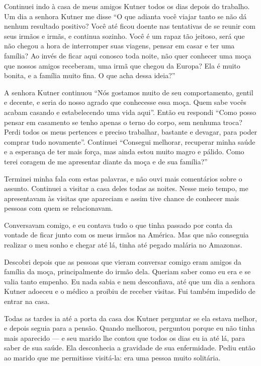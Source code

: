 Continuei indo à casa de meus amigos Kutner todos os dias depois do
trabalho. Um dia a senhora Kutner me disse ``O que adianta você viajar
tanto se não dá nenhum resultado positivo? Você até ficou doente
nas tentativas de se reunir com seus irmãos e irmãs, e continua
sozinho. Você é um rapaz tão jeitoso, será que não chegou a hora de interromper 
suas viagens, pensar em casar e ter uma família? Ao invés de ficar
aqui conosco toda noite, não quer conhecer uma moça que nossos amigos
receberam, uma irmã que chegou da Europa? Ela é muito bonita, e a família
muito fina. O que acha dessa ideia?''

A senhora Kutner continuou ``Nós gostamos muito de seu comportamento,
gentil e decente, e seria do nosso agrado que conhecesse essa moça.
Quem sabe vocês acabam casando e estabelecendo uma vida aqui''. Então
eu respondi ``Como posso pensar em casamento se tenho apenas o
terno do corpo, sem nenhuma troca? Perdi todos os
meus pertences e preciso trabalhar, bastante e devagar, para poder comprar tudo novamente''. Continuei ``Consegui melhorar, recuperar minha saúde e a esperança de ter mais força, mas ainda estou muito magro e
pálido. Como terei coragem de me apresentar diante da moça e de sua
família?''

Terminei minha fala com estas palavras, e não ouvi mais comentários sobre o assunto. 
Continuei a visitar a casa deles todas as
noites. Nesse meio tempo, me apresentavam às visitas que apareciam e assim
tive chance de conhecer mais pessoas com quem se relacionavam.

Conversavam comigo, e eu contava tudo o que tinha passado por conta da
vontade de ficar junto com os meus irmãos na América. Mas que não 
conseguia realizar o meu sonho e chegar até lá, tinha até 
pegado malária no Amazonas.

Descobri depois que as pessoas que vieram conversar comigo eram
amigos da família da moça, principalmente do irmão dela. Queriam saber
como eu era e se valia tanto empenho. Eu nada sabia e nem
desconfiava, até que um dia a senhora Kutner adoeceu e o médico a proibiu
de receber visitas. Fui também impedido de entrar na casa.

Todas as tardes ia até a porta da casa dos Kutner perguntar se ela
estava melhor, e depois seguia para a pensão. Quando melhorou, perguntou
porque eu não tinha mais aparecido --- e seu marido lhe contou que todos os
dias eu ia até lá, para saber de sua saúde. Ela desconhecia a 
gravidade de sua enfermidade. Pediu então ao marido que me permitisse visitá-la: era 
uma pessoa muito solitária.

